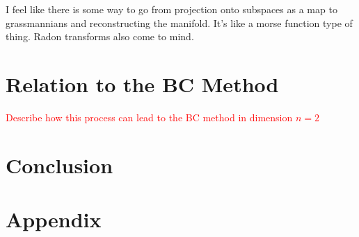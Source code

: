 \documentclass[12pt]{article}
\begin{document}
I feel like there is some way to go from projection onto subspaces as a map to grassmannians and reconstructing the manifold.  It's like a morse function type of thing.  Radon transforms also come to mind.

\section{Relation to the BC Method}

\textcolor{red}{Describe how this process can lead to the BC method in dimension $n=2$}


\section{Conclusion}


\appendix
\section{Appendix}




\end{document}
